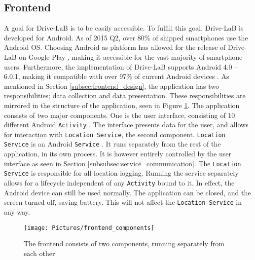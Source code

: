 \subsection{Frontend}\label{subsec:frontend_implementation}
A goal for Drive-LaB is to be easily accessible. To fulfill this goal, Drive-LaB is developed for Android. As of 2015 Q2, over 80\% of shipped smartphones use the Android OS\citep{smartphone_market_share}. Choosing Android as platform has allowed for the release of Drive-LaB on Google Play \citep{google_play_drivelab}, making it accessible for the vast majority of smartphone users. Furthermore, the implementation of Drive-LaB supports Android 4.0 – 6.0.1, making it compatible with over 97\% of current Android devices \citep{android_version_distribution}.
As mentioned in Section \ref{subsec:frontend_design}, the application has two responsibilities; data collection and data presentation. These responsibilities are mirrored in the structure of the application, seen in Figure \ref{fig:frontend_components}. The application consists of two major components. One is the user interface, consisting of 10 different Android \texttt{Activity} \citep{android_activity}. The interface presents data for the user, and allows for interaction with \texttt{Location Service}, the second component. \texttt{Location Service} is an Android \texttt{Service} \citep{android_service}. It runs separately from the rest of the application, in its own process. It is however entirely controlled by the user interface as seen in Section \ref{subsubsec:service_communication}. The \texttt{Location Service} is responsible for all location logging. Running the service separately allows for a lifecycle independent of any \texttt{Activity} bound to it. In effect, the Android device can still be used normally. The application can be closed, and the screen turned off, saving battery. This will not affect the \texttt{Location Service} in any way.

\begin{figure}[tb]
\centering
\texttt{[image: Pictures/frontend\_components]}
\caption{The frontend consists of two components, running separately from each other}
\label{fig:frontend_components}	
\end{figure}

